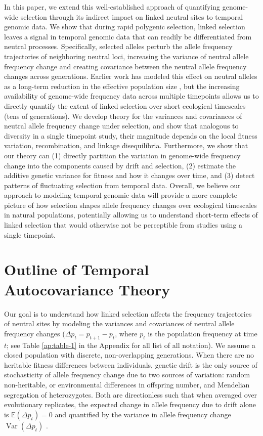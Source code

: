 \documentclass[11pt]{article}
\newcommand{\E}{\mathbb{E}}
\DeclareMathOperator{\var}{Var}
\begin{document}
In this paper, we extend this well-established approach of quantifying
genome-wide selection through its indirect impact on linked neutral sites to
temporal genomic data. We show that during rapid polygenic selection, linked
selection leaves a signal in temporal genomic data that can readily be
differentiated from neutral processes. Specifically, selected alleles perturb
the allele frequency trajectories of neighboring neutral loci, increasing the
variance of neutral allele frequency change and creating covariance between the
neutral allele frequency changes across generations.  Earlier work has modeled
this effect on neutral alleles as a long-term reduction in the effective
population size
\parencite{Robertson1961-ho,Santiago1995-hx,Santiago1998-bs,Wray1990-zf,J_A_Woolliams_N_R_Wray_R_Thompson2008-qo},
but the increasing availability of genome-wide frequency data across multiple
timepoints allows us to directly quantify the extent of linked selection over
short ecological timescales (tens of generations). We develop theory for the
variances and covariances of neutral allele frequency change under selection,
and show that analogous to diversity in a single timepoint study, their
magnitude depends on the local fitness variation, recombination, and linkage
disequilibria. Furthermore, we show that our theory can (1) directly
partition the variation in genome-wide frequency change into the components
caused by drift and selection, (2) estimate the additive genetic
variance for fitness and how it changes over time, and (3) detect patterns of
fluctuating selection from temporal data. Overall, we believe our approach to
modeling temporal genomic data will provide a more complete picture of how
selection shapes allele frequency changes over ecological timescales in natural
populations, potentially allowing us to understand short-term effects of linked
selection that would otherwise not be perceptible from studies using a single
timepoint. 

\section{Outline of Temporal Autocovariance Theory}
\label{sec:outline-temp}

Our goal is to understand how linked selection affects the frequency
trajectories of neutral sites by modeling the variances and covariances of
neutral allele frequency changes ($\Delta p_t = p_{t+1} - p_t$, where $p_t$ is
the population frequency at time $t$; see Table \ref{ap:table-1} in the
Appendix for all list of all notation). We assume a closed population with
discrete, non-overlapping generations. When there are no heritable fitness
differences between individuals, genetic drift is the only source of
stochasticity of allele frequency change due to two sources of variation:
random non-heritable, or environmental differences in offspring number, and
Mendelian segregation of heterozygotes. Both are directionless such that when
averaged over evolutionary replicates, the expected change in allele frequency
due to drift alone is $\E(\Delta p_t) = 0$ and quantified by the variance in
allele frequency change $\var(\Delta p_t)$ \parencite[as quantified by the
variance effective population
size;][]{Wright1938-tv,Crow1970-wm,Charlesworth2009-sg}.
\end{document}
